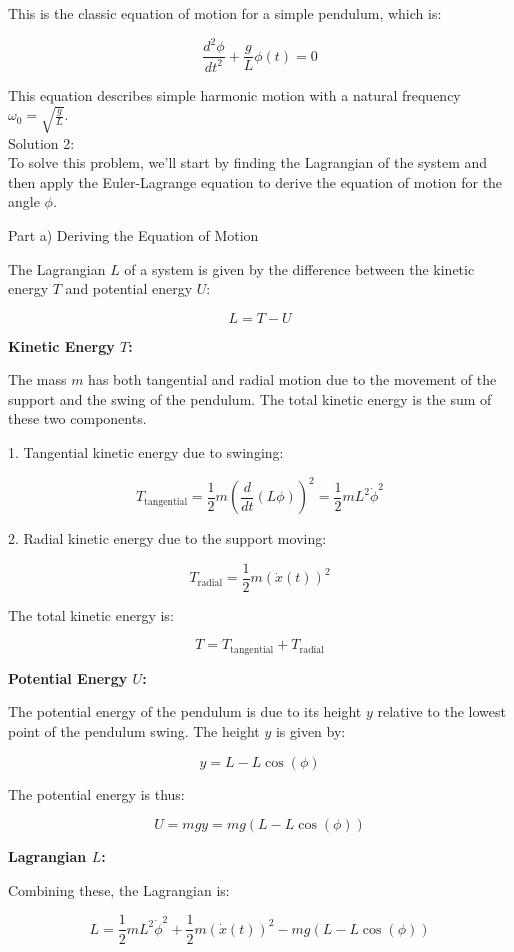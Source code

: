 \documentclass[a4paper,11pt]{article}
\begin{document}
This is the classic equation of motion for a simple pendulum, which is:

\[ \frac{d^2\phi}{dt^2} + \frac{g}{L}\phi(t) = 0 \]

This equation describes simple harmonic motion with a natural frequency \( \omega_0 = \sqrt{\frac{g}{L}} \). \\

\noindent Solution 2: \\

To solve this problem, we'll start by finding the Lagrangian of the system and then apply the Euler-Lagrange equation to derive the equation of motion for the angle \( \phi \).

Part a) Deriving the Equation of Motion

The Lagrangian \( L \) of a system is given by the difference between the kinetic energy \( T \) and potential energy \( U \):

\[ L = T - U \]

\textbf{Kinetic Energy \( T \):}

The mass \( m \) has both tangential and radial motion due to the movement of the support and the swing of the pendulum. The total kinetic energy is the sum of these two components.

1. Tangential kinetic energy due to swinging:

\[ T_{\text{tangential}} = \frac{1}{2} m (\frac{d}{dt}(L \phi))^2 = \frac{1}{2} m L^2 \dot{\phi}^2 \]

2. Radial kinetic energy due to the support moving:

\[ T_{\text{radial}} = \frac{1}{2} m (\dot{x}(t))^2 \]

The total kinetic energy is:

\[ T = T_{\text{tangential}} + T_{\text{radial}} \]

\textbf{Potential Energy \( U \):}

The potential energy of the pendulum is due to its height \( y \) relative to the lowest point of the pendulum swing. The height \( y \) is given by:

\[ y = L - L \cos(\phi) \]

The potential energy is thus:

\[ U = m g y = m g (L - L \cos(\phi)) \]

\textbf{Lagrangian \( L \):}

Combining these, the Lagrangian is:

\[ L = \frac{1}{2} m L^2 \dot{\phi}^2 + \frac{1}{2} m (\dot{x}(t))^2 - m g (L - L \cos(\phi)) \]
\end{document}
